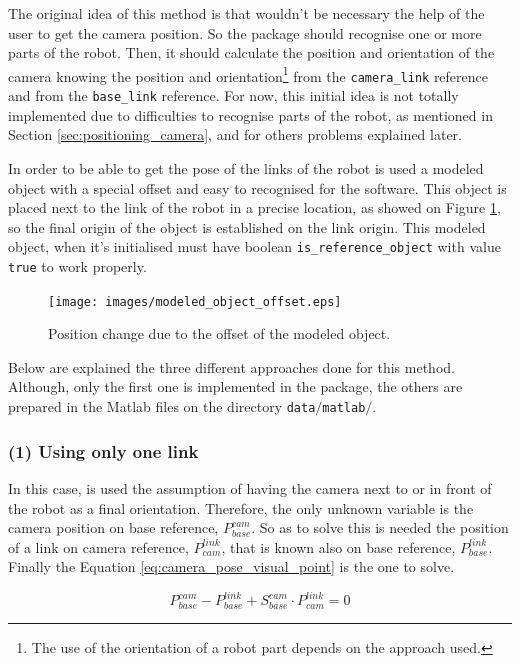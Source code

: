\documentclass[12pt,a4paper,final,twoside,openright]{report}
\begin{document}
The original idea of this method is that wouldn't be necessary the help of the user to get the camera position. So the package should recognise one or more parts of the robot. Then, it should calculate the position and orientation of the camera knowing the position and orientation\footnote{The use of the orientation of a robot part depends on the approach used.} from the \texttt{camera\_link} reference and from the \texttt{base\_link} reference. For now, this initial idea is not totally implemented due to difficulties to recognise parts of the robot, as mentioned in Section \ref{sec:positioning_camera}, and for others problems explained later.

In order to be able to get the pose of the links of the robot is used a modeled object with a special offset and easy to recognised for the software. This object is placed next to the link of the robot in a precise location, as showed on Figure \ref{fig:modeled_object_offset}, so the final origin of the object is established on the link origin. This modeled object, when it's initialised must have boolean \texttt{is\_reference\_object} with value \texttt{true} to work properly.

\begin{figure}
\centering
\texttt{[image: images/modeled\_object\_offset.eps]}
\caption{Position change due to the offset of the modeled object.\label{fig:modeled_object_offset}}
\end{figure}

Below are explained the three different approaches done for this method. Although, only the first one is implemented in the package, the others are prepared in the Matlab files on the directory \texttt{data$/$matlab$/$}.

\vspace{-10pt}
\subsubsection{(1) Using only one link}

In this case, is used the assumption of having the camera next to or in front of the robot as a final orientation. Therefore, the only unknown variable is the camera position on base reference, $P_{base}^{cam}$. So as to solve this is needed the position of a link on camera reference, $P_{cam}^{link}$, that is known also on base reference, $P_{base}^{link}$. Finally the Equation \eqref{eq:camera_pose_visual_point} is the one to solve.

\vspace{-10pt}
\begin{equation}\label{eq:camera_pose_visual_point}
P_{base}^{cam} - P_{base}^{link} + S_{base}^{cam} \cdot P_{cam}^{link} = 0
\end{equation}
\end{document}
